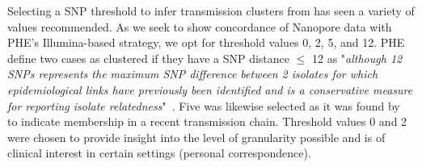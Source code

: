 Selecting a SNP threshold to infer transmission clusters from has seen a
variety of values recommended. As we seek to show
concordance of Nanopore data with PHE's Illumina-based strategy, we opt
for threshold values 0, 2, 5, and 12. PHE define two cases as clustered
if they have a SNP distance $\le$ 12 as "\emph{although 12
SNPs represents the maximum SNP difference between 2 isolates for which
epidemiological links have previously been identified
 and is a conservative measure for reporting
isolate relatedness}"~. Five was likewise selected as
it was found by~ to indicate membership in a recent
transmission chain. Threshold values 0 and 2 were chosen to provide
insight into the level of granularity possible and is of clinical
interest in certain settings (personal correspondence).



